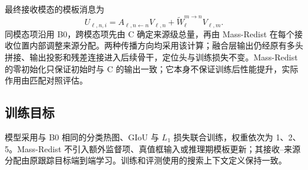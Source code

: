 最终接收模态的模板消息为
\begin{equation}
 U_{\ell,n,i}=A_{\ell,n\leftarrow n}V_{\ell,n}
 +\widetilde W_{\ell}^{m\to n}V_{\ell,m}.
 \label{eq:mr-message}
\end{equation}
同模态项沿用 B0，跨模态项先由 C 确定来源级总量，再由 Mass-Redist 在每个接收位置内部调整来源分配。两种传播方向均采用该计算；融合层输出仍经原有多头拼接、输出投影和残差连接进入后续骨干，定位头与训练损失不变。Mass-Redist 的零初始化只保证初始时与 C 的输出一致；它本身不保证训练后性能提升，实际作用由匹配对照评估。

\subsection{训练目标}
模型采用与 B0 相同的分类热图、GIoU\cite{rezatofighi2019giou} 与 $L_1$ 损失联合训练，权重依次为 1、2、5。Mass-Redist 不引入额外监督项、真值框输入或推理期模板更新；其接收--来源分配由原跟踪目标端到端学习。训练和评测使用的搜索上下文定义保持一致。
